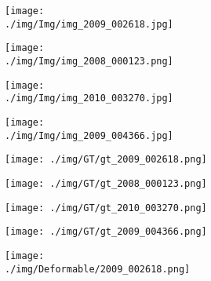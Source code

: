 \documentclass[10pt,twocolumn,letterpaper]{article}
\begin{document}
\begin{figure}[t]
\center
    \begin{subfigure}[t]{0.15\textwidth}
            \begin{subfigure}[t]{\textwidth}
                \texttt{[image: ./img/Img/img\_2009\_002618.jpg]}
            \end{subfigure}\vspace{.1ex}

            \begin{subfigure}[t]{\textwidth}
                \texttt{[image: ./img/Img/img\_2008\_000123.png]}
            \end{subfigure}\vspace{.1ex}

         \begin{subfigure}[t]{\textwidth}
                \texttt{[image: ./img/Img/img\_2010\_003270.jpg]}
            \end{subfigure}\vspace{.1ex}

            \begin{subfigure}[t]{\textwidth}
                \texttt{[image: ./img/Img/img\_2009\_004366.jpg]}
            \end{subfigure}
     \end{subfigure}
\begin{subfigure}[t]{0.15\textwidth}
        \begin{subfigure}[t]{\textwidth}
                \texttt{[image: ./img/GT/gt\_2009\_002618.png]}
            \end{subfigure}\vspace{.1ex}

        \begin{subfigure}[t]{\textwidth}
                \texttt{[image: ./img/GT/gt\_2008\_000123.png]}
            \end{subfigure}\vspace{.1ex}

        \begin{subfigure}[t]{\textwidth}
                \texttt{[image: ./img/GT/gt\_2010\_003270.png]}
            \end{subfigure}\vspace{.1ex}

            \begin{subfigure}[t]{\textwidth}
                \texttt{[image: ./img/GT/gt\_2009\_004366.png]}
     \captionsetup{justification=centering}       
            \end{subfigure}
    \end{subfigure}
\begin{subfigure}[t]{0.15\textwidth}
        \begin{subfigure}[t]{\textwidth}
                \texttt{[image: ./img/Deformable/2009\_002618.png]}
            \end{subfigure}\vspace{.1ex}


\end{subfigure}
\end{figure}
\end{document}
